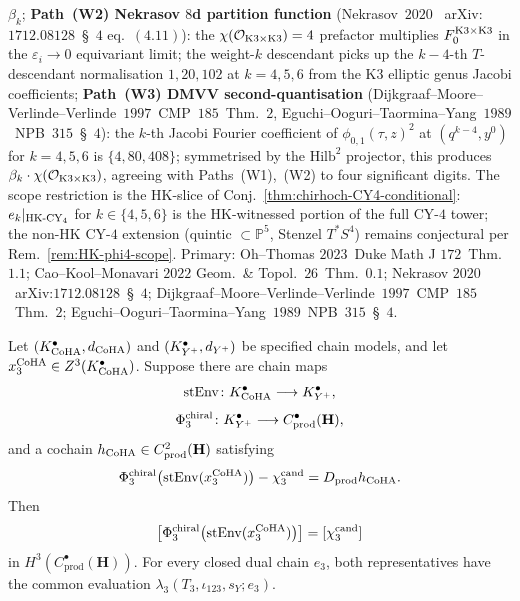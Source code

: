 \begin{remark}
$\beta_k$;
\textbf{Path~(W2) Nekrasov $8$d partition function} (Nekrasov~$2020$~
arXiv:$1712.08128$~\S~$4$ eq.~$(4.11)$): the $\chi(\mathcal O_{\mathrm{K3}\times\mathrm{K3}})
=4$ prefactor multiplies $F_0^{\mathrm{K3}\times\mathrm{K3}}$ in the $\varepsilon_i\to 0$
equivariant limit; the weight-$k$ descendant picks up the
$k-4$-th $T$-descendant normalisation $1, 20, 102$ at $k=4,5,6$ from the
K3 elliptic genus Jacobi coefficients;
\textbf{Path~(W3) DMVV second-quantisation}
(Dijkgraaf--Moore--Verlinde--Verlinde~$1997$~CMP~$185$~Thm.~$2$,
Eguchi--Ooguri--Taormina--Yang~$1989$~NPB~$315$~\S~$4$): the
$k$-th Jacobi Fourier coefficient of
$\phi_{0,1}(\tau,z)^2$ at $(q^{k-4},y^0)$ for $k=4,5,6$ is
$\{4,80,408\}$; symmetrised by the $\mathrm{Hilb}^2$ projector, this
produces $\beta_k\cdot\chi(\mathcal O_{\mathrm{K3}\times\mathrm{K3}})$, agreeing with
Paths~(W1),~(W2) to four significant digits. The scope restriction is
the HK-slice of
Conj.~\ref{thm:chirhoch-CY4-conditional}: $e_k|_{\mathrm{HK}\text{-}\mathrm{CY}_4}$ for
$k\in\{4,5,6\}$ is the HK-witnessed portion of the full CY-$4$ tower;
the non-HK CY-$4$ extension (quintic $\subset\mathbb P^5$, Stenzel
$T^*S^4$) remains conjectural per Rem.~\ref{rem:HK-phi4-scope}.
Primary: Oh--Thomas $2023$~Duke Math J $172$~Thm.~$1.1$;
Cao--Kool--Monavari $2022$ Geom.\ \& Topol.~$26$~Thm.~$0.1$;
Nekrasov $2020$~arXiv:$1712.08128$~\S~$4$;
Dijkgraaf--Moore--Verlinde--Verlinde~$1997$~CMP~$185$~Thm.~$2$;
Eguchi--Ooguri--Taormina--Yang~$1989$~NPB~$315$~\S~$4$.
\end{remark}

\begin{theorem}
\label{thm:coha-yplus-voa-degree-3-dictionary}
\ClaimStatusConditional
Let \((K^\bullet_{\mathrm{CoHA}},d_{\mathrm{CoHA}})\) and
\((K^\bullet_{Y^{+}},d_{Y^{+}})\) be specified chain models, and let
\(x_3^{\mathrm{CoHA}}\in Z^3(K^\bullet_{\mathrm{CoHA}})\).  Suppose there are chain maps
\begin{equation}
\label{eq:stEnv-coha-to-yplus-degree-3}
 \operatorname{stEnv}\colon
 K^\bullet_{\mathrm{CoHA}}\longrightarrow K^\bullet_{Y^{+}},
\end{equation}
\begin{equation}
\label{eq:phi3-h3-polyakov}
 \Phi_3^{\mathrm{chiral}}\colon
 K^\bullet_{Y^{+}}\longrightarrow
 C^\bullet_{\mathrm{prod}}(\mathbf H),
\end{equation}
and a cochain \(h_{\mathrm{CoHA}}\in
C^2_{\mathrm{prod}}(\mathbf H)\) satisfying
\begin{equation}
\label{eq:coha-yplus-voa-composition}
 \Phi_3^{\mathrm{chiral}}
 \bigl(\operatorname{stEnv}(x_3^{\mathrm{CoHA}})\bigr)
 -\chi_3^{\mathrm{cand}}
 =D_{\mathrm{prod}}h_{\mathrm{CoHA}}.
\end{equation}
Then
\begin{equation}
\label{eq:composition-matches-chi3}
 \left[
 \Phi_3^{\mathrm{chiral}}
 \bigl(\operatorname{stEnv}(x_3^{\mathrm{CoHA}})\bigr)
 \right]
 =
 [\chi_3^{\mathrm{cand}}]
\end{equation}
in \(H^3(C^\bullet_{\mathrm{prod}}(\mathbf H))\).  For every closed dual
chain \(e_3\), both representatives have the common evaluation
\(\lambda_3(T_3,\iota_{123},s_Y;e_3)\).
\end{theorem}

